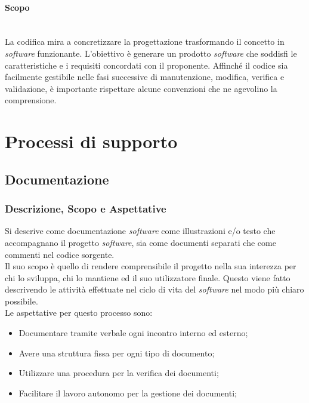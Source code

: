 \documentclass[5pt]{article}
\begin{document}
\paragraph{Scopo}~\\
La codifica mira a concretizzare la progettazione trasformando il concetto in \textit{software} funzionante. L'obiettivo è generare un prodotto \textit{software} che soddisfi le caratteristiche e i requisiti concordati con il proponente. Affinché il codice sia facilmente gestibile nelle fasi successive di manutenzione, modifica, verifica e validazione, è importante rispettare alcune convenzioni che ne agevolino la comprensione.


\section{Processi di supporto}

\subsection{Documentazione}
\subsubsection{Descrizione, Scopo e Aspettative }
Si descrive come documentazione \textit{software} come illustrazioni e/o testo che accompagnano il progetto \textit{software}, sia come documenti separati che come commenti nel codice sorgente.\\
Il suo scopo è quello di rendere comprensibile il progetto nella sua interezza per chi lo sviluppa, chi lo mantiene ed il suo utilizzatore finale. Questo viene fatto descrivendo le attività effettuate nel ciclo di vita del \textit{software} nel modo più chiaro possibile.\\
Le aspettative per questo processo sono:
\begin{itemize}
    \item Documentare tramite verbale ogni incontro interno ed esterno;
    \item Avere una struttura fissa per ogni tipo di documento;
    \item Utilizzare una procedura per la verifica dei documenti;
    \item Facilitare il lavoro autonomo per la gestione dei documenti;
\end{itemize}
\end{document}
